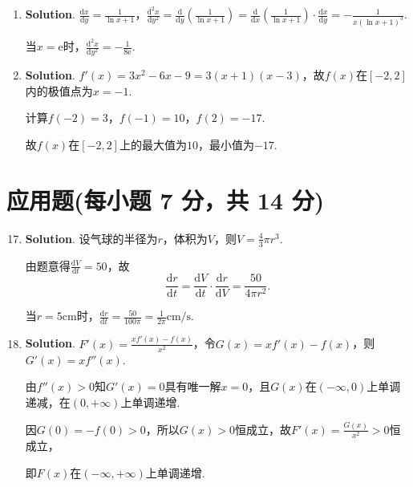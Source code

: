 \documentclass[../Main.tex]{subfiles}
\begin{document}
\begin{enumerate}
          利用$\left(\frac{1}{a-x}\right)^{(n)}=\frac{n!}{(a-x)^{n+1}}$，得
          \[
              y^{(50)}(0)=\left.\left(\frac{4}{2-x}\right)^{(50)}\right|_{x=0}-0=\frac{4\cdot50!}{2^{51}}
              =\frac{50!}{2^{49}}.
          \]

    \item \textbf{Solution}. $\frac{\mathrm{d}x}{\mathrm{d}y}=\frac{1}{\ln
                  x+1}$，$\frac{\mathrm{d}^{2} x}{\mathrm{d}y^{2}}=\frac{\mathrm{d}}{\mathrm{d}y}
              \left(\frac{1}{\ln x+1}\right)=\frac{\mathrm{d}}{\mathrm{d}x}\left(\frac{1}{\ln
                  x+1}\right)\cdot\frac{\mathrm{d}x}{\mathrm{d}y}=-\frac{1}{x(\ln x+1)^{3}}$.

          当$x=\mathrm{e}$时，$\frac{\mathrm{d}^{2} x}{\mathrm{d}y^{2}}=-\frac{1}{8\mathrm{e}}$.

    \item \textbf{Solution}. $f'(x)=3x^{2}-6x-9=3(x+1)(x-3)$，故$f(x)$在$[-2
                  ,2]$内的极值点为$x=-1$.

          计算$f(-2)=3$，$f(-1)=10$，$f(2)=-17$.

          故$f(x)$在$[-2,2]$上的最大值为$10$，最小值为$-17$.
\end{enumerate}

\section{应用题(每小题 7 分，共 14 分)}
\begin{enumerate}
    \setcounter{enumi}{16}
    \item \textbf{Solution}. 设气球的半径为$r$，体积为$V$，则$V=\frac{4}{3}\pi r
                  ^{3}$.

          由题意得$\frac{\mathrm{d}V}{\mathrm{d}t}=50$，故
          \[
              \frac{\mathrm{d}r}{\mathrm{d}t}=\frac{\mathrm{d}V}{\mathrm{d}t}\cdot\frac{\mathrm{d}r}{\mathrm{d}V}
              =\frac{50}{4\pi r^{2}}.
          \]

          当$r=5\mathrm{cm}$时，$\frac{\mathrm{d}r}{\mathrm{d}t}=\frac{50}{100\pi}=\frac{1}{2\pi}
              \mathrm{cm/s}$.

    \item \textbf{Solution}. $F'(x)=\frac{xf'(x)-f(x)}{x^{2}}$，令$G(x)=xf'(x)-
              f(x)$，则$G'(x)=xf''(x)$.

          由$f''(x)>0$知$G'(x)=0$具有唯一解$x=0$，且$G(x)$在$(-\infty,0)$上单调递减，在$(
              0,+\infty)$上单调递增.

          因$G(0)=-f(0)>0$，所以$G(x)>0$恒成立，故$F'(x)=\frac{G(x)}{x^{2}}>0$恒成立，

          即$F(x)$在$\left(-\infty,+\infty\right)$上单调递增.
\end{enumerate}
\end{document}
